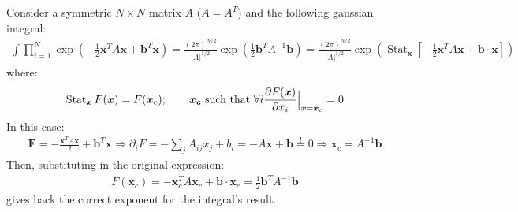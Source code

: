 \documentclass[../template.tex]{subfiles}
\begin{document}
Consider a symmetric $N\times N$ matrix $A$ ($A = A^T$) and the following gaussian integral:
\begin{align*}
    \int \prod_{i=1}^N \exp\left(-\frac{1}{2} \bm{x}^T A \bm{x} + \bm{b}^T \bm{x}  \right) = \frac{(2 \pi)^{N/2}}{|A|^{1/2}} \exp\left(\frac{1}{2} \bm{b}^T A^{-1} \bm{b} \right) = \frac{(2\pi)^{N/2}}{|A|^{1/2}} \exp\left(\operatorname{Stat}_{\bm{x}} \left[-\frac{1}{2} \bm{x}^T A \bm{x} + \bm{b} \cdot \bm{x} \right] \right) 
\end{align*}
where:
\begin{align*}
    \operatorname{Stat}_{\bm{x}} F(\bm{x}) = F(\bm{x}_c); \qquad \bm{x_c} \text{ such that } \forall i \pdv{F(\bm{x})}{x_i} \Big|_{\bm{x} = \bm{x}_c} = 0
\end{align*}
In this case:
\begin{align*}
    \bm{F} = -\frac{\bm{x}^T A \bm{x}}{2} + \bm{b}^T \bm{x} \Rightarrow \partial_i F = - \sum_{j} A_{ij} x_j + b_i = - A\bm{x} + \bm{b} \overset{!}{=}  0 \Rightarrow\bm{x}_c = A^{-1}\bm{b}  
\end{align*}
Then, substituting in the original expression:
\begin{align*}
    F(\bm{x}_c) = - \bm{x}_c^T A \bm{x}_c + \bm{b} \cdot \bm{x}_c = \frac{1}{2} \bm{b}^T A^{-1} \bm{b}
\end{align*}
gives back the correct exponent for the integral's result.
\end{document}
